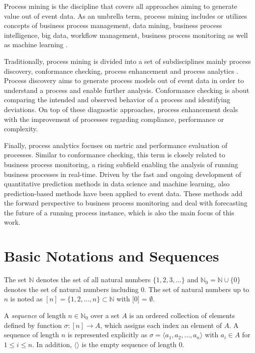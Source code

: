 Process mining is the discipline that covers all approaches aiming to generate value out of event data.
As an umbrella term, process mining includes or utilizes concepts of business process management, data mining, business process intelligence, big data, workflow management, business process monitoring \cite{DBLP:books/sp/Aalst16} as well as machine learning \cite{DBLP:conf/bpm/VeitGMHT17}.

Traditionally, process mining is divided into a set of subdisciplines mainly process discovery, conformance checking, process enhancement and process analytics \cite{DBLP:conf/caise/EckLLA15}.
Process discovery aims to generate process models out of event data in order to understand a process and enable further analysis.
Conformance checking is about comparing the intended and observed behavior of a process and identifying deviations.
On top of these diagnostic approaches, process enhancement deals with the improvement of processes regarding compliance, performance or complexity.

Finally, process analytics focuses on metric and performance evaluation of processes. Similar to conformance checking, this term is closely related to business process monitoring, a rising subfield enabling the analysis of running business processes in real-time.
Driven by the fast and ongoing development of quantitative prediction methods in data science and machine learning, also prediction-based methods have been applied to event data.
These methods add the forward perspective to business process monitoring and deal with forecasting the future of a running process instance, which is also the main focus of this work.


\section{Basic Notations and Sequences}

The set $\mathbb{N}$ denotes the set of all natural numbers $\{1, 2, 3, \dots\}$ and $\mathbb{N}_0 = \mathbb{N} \cup \{0\}$ denotes the set of natural numbers including 0.
The set of natural numbers up to $n$ is noted as $[n] = \{1, 2, \dots, n\} \subset \mathbb{N}$ with [0] = $\emptyset$.

\begin{definition}[Sequence]
		A \textit{sequence} of length $n \in \mathbb{N}_0$ over a set $A$ is an ordered collection of elements defined by function $\sigma \colon [n]\to A$, which assigns each index an element of $A$.
		A sequence  of length $n$ is represented explicitly as $\sigma = \langle a_1, a_2, \dots, a_n\rangle $ with $a_i \in A$ for $1 \leq i \leq n$. In addition, $\langle \rangle$ is the empty sequence of length $0$.
\end{definition}


